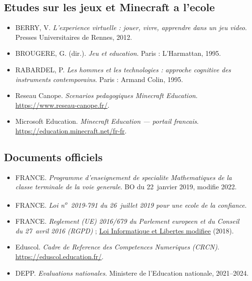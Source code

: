 \documentclass[12pt,a4paper]{scrartcl}
\begin{document}
\subsection{Etudes sur les jeux et Minecraft a l'ecole}
\begin{itemize}[leftmargin=1.3em,itemsep=0.15em,topsep=0.3em]
  \item BERRY, V. \emph{L'experience virtuelle : jouer, vivre, apprendre dans un jeu video}. Presses Universitaires de Rennes, 2012.
  \item BROUGERE, G. (dir.). \emph{Jeu et education}. Paris : L'Harmattan, 1995.
  \item RABARDEL, P. \emph{Les hommes et les technologies : approche cognitive des instruments contemporains}. Paris : Armand Colin, 1995.
  \item Reseau Canope. \emph{Scenarios pedagogiques Minecraft Education}. \url{https://www.reseau-canope.fr/}.
  \item Microsoft Education. \emph{Minecraft Education --- portail francais}. \url{https://education.minecraft.net/fr-fr}.
\end{itemize}

\subsection{Documents officiels}
\begin{itemize}[leftmargin=1.3em,itemsep=0.15em,topsep=0.3em]
  \item FRANCE. \emph{Programme d'enseignement de specialite Mathematiques de la classe terminale de la voie generale}. BO du 22~janvier 2019, modifie 2022.
  \item FRANCE. \emph{Loi n\textsuperscript{o}~2019-791 du 26~juillet 2019 pour une ecole de la confiance}.
  \item FRANCE. \emph{Reglement (UE) 2016/679 du Parlement europeen et du Conseil du 27~avril 2016 (RGPD)} ; \href{https://www.cnil.fr/}{Loi Informatique et Libertes modifiee} (2018).
  \item Eduscol. \emph{Cadre de Reference des Competences Numeriques (CRCN)}. \url{https://eduscol.education.fr/}.
  \item DEPP. \emph{Evaluations nationales}. Ministere de l'Education nationale, 2021--2024.
\end{itemize}
\end{document}
